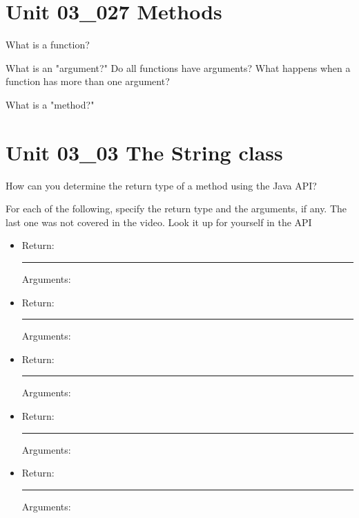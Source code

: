 \documentclass[letterpaper,12pt]{exam}
\newcommand{\unit}{Unit 03}
\begin{document}
\begin{questions}
\section*{\unit\_027 Methods} %


\begin{samepage}
	\question What is a function?
	\vspace{5mm}
\end{samepage}

\begin{samepage}
	\question What is an "argument?"  Do all functions have arguments?  What happens when a function has more than one argument?
	\vspace{5mm}
\end{samepage}

\begin{samepage}
	\question What is a "method?"  
	\vspace{5mm}
\end{samepage}

\section*{\unit\_03 The String class} %

\begin{samepage}
	\question How can you determine the return type of a method using the Java API?
	\vspace{5mm}
\end{samepage}
\begin{samepage}
	\question For each of the following, specify the return type and the arguments, if any.
	The last one was not covered in the video.  Look it up for yourself in the API
	  \begin{itemize}
		\item {} Return:  \rule{20mm}{0.15mm}     Arguments: 
		\vspace{5mm}
		\item {} Return:   \rule{20mm}{0.15mm}     Arguments: 
		\vspace{5mm}
		\item {} Return:   \rule{20mm}{0.15mm}      Arguments:
		\vspace{5mm}
		\item {} Return:  \rule{20mm}{0.15mm}       Arguments:
		\vspace{5mm}
		\item {} Return:   \rule{20mm}{0.15mm}      Arguments:
		\vspace{5mm}
	\end{itemize}
\end{samepage}


\end{questions}
\end{document}

